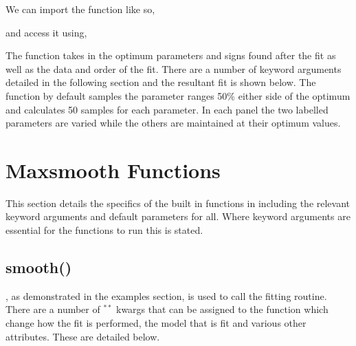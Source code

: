 \documentclass[letterpaper,10pt,english]{sphinxmanual}
\begin{document}
We can import the function like so,

\begin{sphinxVerbatim}[commandchars=\\\{\}]
   
\end{sphinxVerbatim}

and access it using,

\begin{sphinxVerbatim}[commandchars=\\\{\}]
 
       
\end{sphinxVerbatim}

The function takes in the optimum parameters and signs found after the fit
as well as the data and order of the fit. There are a number of keyword arguments
detailed in the following section and the resultant fit is shown below. The
function by default samples the parameter ranges 50\% either side of the optimum
and calculates 50 samples for each parameter. In each panel the two
labelled parameters are varied while the others are maintained at their optimum
values.

\noindent{}


\chapter{Maxsmooth Functions}
\label{\detokenize{source/maxsmooth:maxsmooth-functions}}
This section details the specifics of the built in functions in  including
the relevant keyword arguments and default parameters for all. Where keyword arguments
are essential for the functions to run this is stated.


\section{smooth()}
\label{\detokenize{source/maxsmooth:module-maxsmooth.DCF}}\label{\detokenize{source/maxsmooth:smooth}}
, as demonstrated in the examples section,
is used to call the fitting routine. There are a number
of \({^{**}}\) kwargs that can be assigned to the function which change how
the fit is performed, the model that is fit and various other attributes.
These are detailed below.
\end{document}
